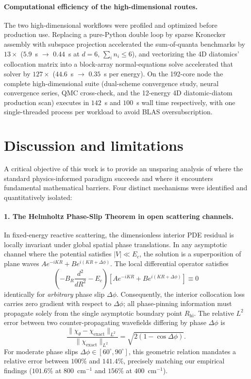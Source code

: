 \documentclass[11pt,a4paper]{article}
\newcommand{\cmi}{\ensuremath{\mathrm{cm}^{-1}}}
\begin{document}
\paragraph{Computational efficiency of the high-dimensional routes.}
The two high-dimensional workflows were profiled and optimized before production use.
Replacing a pure-Python double loop by sparse Kronecker assembly with subspace projection
accelerated the sum-of-quanta benchmarks by $13\times$ ($5.9$~s $\to$ $0.44$~s at
$d=6$, $\sum_i n_i \le 6$), and vectorizing the 4D diatomics' collocation matrix into a
block-array normal-equations solve accelerated that solver by $127\times$
($44.6$~s $\to$ $0.35$~s per energy). On the 192-core node the complete high-dimensional
suite (dual-scheme convergence study, neural convergence series, QMC cross-check, and the
12-energy 4D diatomic-diatom production scan) executes in $142$~s and $100$~s wall time
respectively, with one single-threaded process per workload to avoid BLAS oversubscription.

\section{Discussion and limitations}

A critical objective of this work is to provide an unsparing analysis of where the
standard physics-informed paradigm succeeds and where it encounters fundamental
mathematical barriers. Four distinct mechanisms were identified and quantitatively isolated:

\paragraph{1. The Helmholtz Phase-Slip Theorem in open scattering channels.}
In fixed-energy reactive scattering, the dimensionless interior PDE residual is
locally invariant under global spatial phase translations. In any asymptotic channel
where the potential satisfies $|V| \ll E_c$, the solution is a superposition of
plane waves $A e^{-i K R} + B e^{i (K R + \Delta \phi)}$. The local differential operator
satisfies
\begin{equation}
 \left( -B_R \frac{d^2}{dR^2} - E_c \right) \left[ A e^{-i K R} + B e^{i (K R + \Delta \phi)} \right] \equiv 0
\end{equation}
identically for \emph{arbitrary} phase slip $\Delta \phi$. Consequently, the interior
collocation loss carries zero gradient with respect to $\Delta \phi$; all phase-pinning
information must propagate solely from the single asymptotic boundary point $R_{\mathrm{hi}}$.
The relative $L^2$ error between two counter-propagating wavefields differing by phase $\Delta \phi$ is
\begin{equation}
 \frac{\|\chi_{\theta} - \chi_{\mathrm{exact}}\|_{L^2}}{\|\chi_{\mathrm{exact}}\|_{L^2}} = \sqrt{2 \left( 1 - \cos \Delta \phi \right)} .
\end{equation}
For moderate phase slips $\Delta \phi \in [60^\circ, 90^\circ]$, this geometric relation
mandates a relative error between $100\%$ and $141.4\%$, precisely matching our empirical
findings ($101.6\%$ at $800$~\cmi{} and $156\%$ at $400$~\cmi{}).
\end{document}
